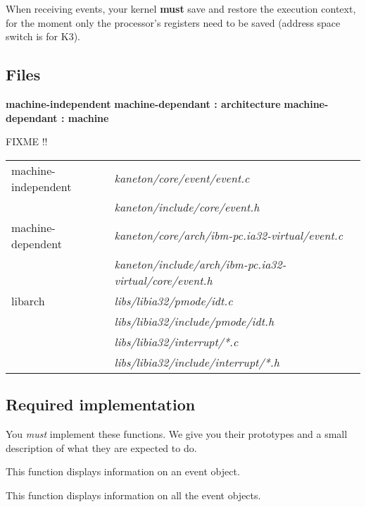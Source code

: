 When receiving events, your kernel \textbf{must} save and restore
the execution context, for the moment only the processor's
registers need to be saved (address space switch is for K3).\\

\subsection*{Files}

    {\color{filerefcolor} \textbf{machine-independent}}
    {\color{filerefcolor} \textbf{machine-dependant : architecture}}
    {\color{filerefcolor} \textbf{machine-dependant : machine}}

    FIXME !!

    \begin{tabular}{| l | l |}
      \hline
      machine-independent & {\em kaneton/core/event/event.c}\\
      &  {\em kaneton/include/core/event.h}\\\hline
      machine-dependent & {\em kaneton/core/arch/ibm-pc.ia32-virtual/event.c}\\
      & {\em kaneton/include/arch/ibm-pc.ia32-virtual/core/event.h}\\\hline
      libarch & {\em libs/libia32/pmode/idt.c}\\
      & {\em libs/libia32/include/pmode/idt.h}\\
      & {\em libs/libia32/interrupt/*.c}\\
      & {\em libs/libia32/include/interrupt/*.h}\\\hline
    \end{tabular}

\newline
\subsection*{Required implementation}
You \textit{must} implement these functions. We give you their prototypes
and a small description of what they are expected to do.

	 {
	   This function displays information on an event object.
	 }

	 {
	   This function displays information on all the event objects.
	 }

